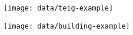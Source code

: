 \begin{figure}[htb]
  \texttt{[image: data/teig-example]}
\end{figure}

\begin{figure}[htb]
  \texttt{[image: data/building-example]}
\end{figure}
